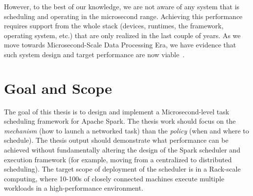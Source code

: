\documentclass[10pt,a4paper]{article}
\begin{document}
However, to the best of our knowledge, we are not aware of any system that 
is scheduling and operating in the microsecond range. Achieving this 
performance requires support from the whole stack (devices, runtimes,
the framework, operating system, etc.) that are only realized in the 
last couple of years. As we move towards Microsecond-Scale Data Processing 
Era, we have evidence that such system design and target performance 
are now viable~\cite{2017-sosp-zygos,2017-killer}.

% 
% 


\section*{Goal and Scope}
The goal of this thesis is to design and implement a Microsecond-level
task scheduling framework for Apache Spark. The thesis work should focus on 
the \textit{mechanism} (how to launch a networked task) than the 
\textit{policy} (when and where to schedule). The
thesis output should demonstrate what performance can be achieved without
fundamentally altering the design of the Spark scheduler and execution 
framework (for example, moving from a centralized to distributed scheduling).
The target scope of deployment of the scheduler is in a Rack-scale computing,
where 10-100s of closely connected machines execute multiple workloads in a 
high-performance environment. 
  
\end{document}
